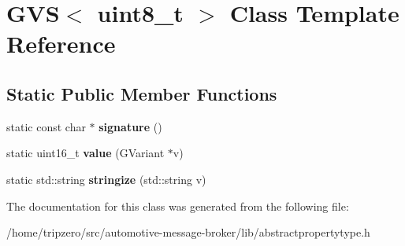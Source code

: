 \hypertarget{classGVS_3_01uint8__t_01_4}{\section{G\-V\-S$<$ uint8\-\_\-t $>$ Class Template Reference}
\label{classGVS_3_01uint8__t_01_4}
}
\subsection*{Static Public Member Functions}
\begin{DoxyCompactItemize}
\item 
\hypertarget{classGVS_3_01uint8__t_01_4_af4461f1166de1f9e6b9352dc5b1d63c9}{static const char $\ast$ {\bfseries signature} ()}\label{classGVS_3_01uint8__t_01_4_af4461f1166de1f9e6b9352dc5b1d63c9}

\item 
\hypertarget{classGVS_3_01uint8__t_01_4_abf59815e2156c5d5f6e0ff3e1b80a056}{static uint16\-\_\-t {\bfseries value} (G\-Variant $\ast$v)}\label{classGVS_3_01uint8__t_01_4_abf59815e2156c5d5f6e0ff3e1b80a056}

\item 
\hypertarget{classGVS_3_01uint8__t_01_4_aa4ec56fe68e039bcfa320c104a8fe727}{static std\-::string {\bfseries stringize} (std\-::string v)}\label{classGVS_3_01uint8__t_01_4_aa4ec56fe68e039bcfa320c104a8fe727}

\end{DoxyCompactItemize}


The documentation for this class was generated from the following file\-:\begin{DoxyCompactItemize}
\item 
/home/tripzero/src/automotive-\/message-\/broker/lib/abstractpropertytype.\-h\end{DoxyCompactItemize}
